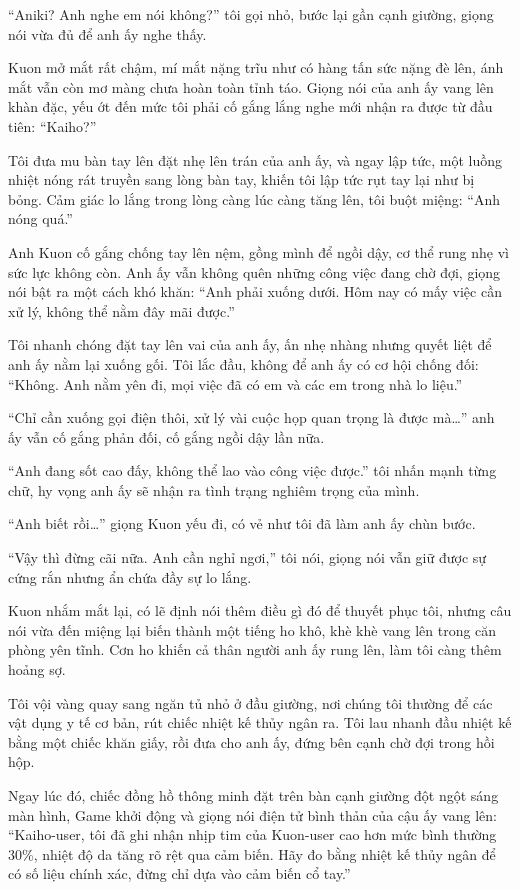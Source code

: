 \documentclass[../main.tex]{subfiles}
\begin{document}
``Aniki? Anh nghe em nói không?'' tôi gọi nhỏ, bước lại gần cạnh giường, giọng nói vừa đủ để anh ấy nghe thấy.

Kuon mở mắt rất chậm, mí mắt nặng trĩu như có hàng tấn sức nặng đè lên, ánh mắt vẫn còn mơ màng chưa hoàn toàn tỉnh táo. Giọng nói của anh ấy vang lên khàn đặc, yếu ớt đến mức tôi phải cố gắng lắng nghe mới nhận ra được từ đầu tiên: ``Kaiho?''

Tôi đưa mu bàn tay lên đặt nhẹ lên trán của anh ấy, và ngay lập tức, một luồng nhiệt nóng rát truyền sang lòng bàn tay, khiến tôi lập tức rụt tay lại như bị bỏng. Cảm giác lo lắng trong lòng càng lúc càng tăng lên, tôi buột miệng: ``Anh nóng quá.''

Anh Kuon cố gắng chống tay lên nệm, gồng mình để ngồi dậy, cơ thể rung nhẹ vì sức lực không còn. Anh ấy vẫn không quên những công việc đang chờ đợi, giọng nói bật ra một cách khó khăn: ``Anh phải xuống dưới. Hôm nay có mấy việc cần xử lý, không thể nằm đây mãi được.''

Tôi nhanh chóng đặt tay lên vai của anh ấy, ấn nhẹ nhàng nhưng quyết liệt để anh ấy nằm lại xuống gối. Tôi lắc đầu, không để anh ấy có cơ hội chống đối: ``Không. Anh nằm yên đi, mọi việc đã có em và các em trong nhà lo liệu.''

``Chỉ cần xuống gọi điện thôi, xử lý vài cuộc họp quan trọng là được mà\dots'' anh ấy vẫn cố gắng phản đối, cố gắng ngồi dậy lần nữa.

``Anh đang sốt cao đấy, không thể lao vào công việc được.'' tôi nhấn mạnh từng chữ, hy vọng anh ấy sẽ nhận ra tình trạng nghiêm trọng của mình.

``Anh biết rồi\dots'' giọng Kuon yếu đi, có vẻ như tôi đã làm anh ấy chùn bước.

``Vậy thì đừng cãi nữa. Anh cần nghỉ ngơi,'' tôi nói, giọng nói vẫn giữ được sự cứng rắn nhưng ẩn chứa đầy sự lo lắng.

Kuon nhắm mắt lại, có lẽ định nói thêm điều gì đó để thuyết phục tôi, nhưng câu nói vừa đến miệng lại biến thành một tiếng ho khô, khè khè vang lên trong căn phòng yên tĩnh. Cơn ho khiến cả thân người anh ấy rung lên, làm tôi càng thêm hoảng sợ.

Tôi vội vàng quay sang ngăn tủ nhỏ ở đầu giường, nơi chúng tôi thường để các vật dụng y tế cơ bản, rút chiếc nhiệt kế thủy ngân ra. Tôi lau nhanh đầu nhiệt kế bằng một chiếc khăn giấy, rồi đưa cho anh ấy, đứng bên cạnh chờ đợi trong hồi hộp.

Ngay lúc đó, chiếc đồng hồ thông minh đặt trên bàn cạnh giường đột ngột sáng màn hình, Game khởi động và giọng nói điện tử bình thản của cậu ấy vang lên: ``Kaiho-user, tôi đã ghi nhận nhịp tim của Kuon-user cao hơn mức bình thường 30\%, nhiệt độ da tăng rõ rệt qua cảm biến. Hãy đo bằng nhiệt kế thủy ngân để có số liệu chính xác, đừng chỉ dựa vào cảm biến cổ tay.''
\end{document}
